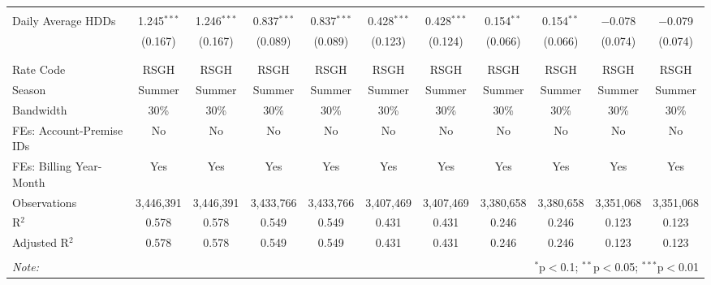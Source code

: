 \begin{table}[!htbp]
\begin{tabular}{@{\extracolsep{5pt}}lcccccccccc}
  & & & & & & & & & & \\ 
 Daily Average HDDs & 1.245$^{***}$ & 1.246$^{***}$ & 0.837$^{***}$ & 0.837$^{***}$ & 0.428$^{***}$ & 0.428$^{***}$ & 0.154$^{**}$ & 0.154$^{**}$ & $-$0.078 & $-$0.079 \\ 
  & (0.167) & (0.167) & (0.089) & (0.089) & (0.123) & (0.124) & (0.066) & (0.066) & (0.074) & (0.074) \\ 
  & & & & & & & & & & \\ 
\hline \\[-1.8ex] 
Rate Code & RSGH & RSGH & RSGH & RSGH & RSGH & RSGH & RSGH & RSGH & RSGH & RSGH \\ 
Season & Summer & Summer & Summer & Summer & Summer & Summer & Summer & Summer & Summer & Summer \\ 
Bandwidth & 30\% & 30\% & 30\% & 30\% & 30\% & 30\% & 30\% & 30\% & 30\% & 30\% \\ 
FEs: Account-Premise IDs & No & No & No & No & No & No & No & No & No & No \\ 
FEs: Billing Year-Month & Yes & Yes & Yes & Yes & Yes & Yes & Yes & Yes & Yes & Yes \\ 
Observations & 3,446,391 & 3,446,391 & 3,433,766 & 3,433,766 & 3,407,469 & 3,407,469 & 3,380,658 & 3,380,658 & 3,351,068 & 3,351,068 \\ 
R$^{2}$ & 0.578 & 0.578 & 0.549 & 0.549 & 0.431 & 0.431 & 0.246 & 0.246 & 0.123 & 0.123 \\ 
Adjusted R$^{2}$ & 0.578 & 0.578 & 0.549 & 0.549 & 0.431 & 0.431 & 0.246 & 0.246 & 0.123 & 0.123 \\ 
\hline 
\hline \\[-1.8ex] 
\textit{Note:}  & \multicolumn{10}{r}{$^{*}$p$<$0.1; $^{**}$p$<$0.05; $^{***}$p$<$0.01} \\ 
\end{tabular} 
\end{table} 
